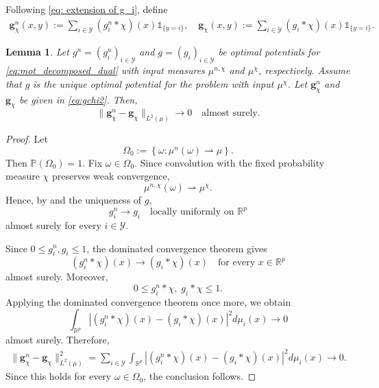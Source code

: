 \documentclass{amsart}
\theoremstyle{plain}
\numberwithin{equation}{section}\newtheorem{theorem}{Theorem}[section]
\newtheorem{lemma}[theorem]{Lemma}
\theoremstyle{remark}
\begin{document}
Following \eqref{eq: extension of g_i}, define
\begin{align}
\label{eq:gchi2}
    \bm g_\chi^n(x,y)
    :=
    \sum_{i\in\mathcal Y}
    (g_i^n*\chi)(x)\mathds 1_{\{y=i\}},
    \quad
    \bm g_\chi(x,y)
    :=
    \sum_{i\in\mathcal Y}
    (g_i*\chi)(x)\mathds 1_{\{y=i\}}.
\end{align}



\begin{lemma}\label{lem: L2 convergence smoothed potentials}
Let $g^n=(g_i^n)_{i\in\mathcal Y}$ and
$g=(g_i)_{i\in\mathcal Y}$ be optimal potentials for
\eqref{eq:mot_decomposed_dual} with input measures
$\mu^{n,\chi}$ and $\mu^\chi$, respectively.
Assume that $g$ is the unique optimal potential for the problem with input $\mu^\chi$. Let $\bm g_\chi^n$ and $\bm g_\chi$ be given in \eqref{eq:gchi2}. Then, 
\[
    \|\bm g_\chi^n-\bm g_\chi\|_{L^2(\mu)}
    \longrightarrow 0 \quad \text{almost surely}.
\]

\end{lemma}

\begin{proof}
Let
\[
    \Omega_0
    :=
    \left\{
        \omega:
        \mu^n(\omega)\rightharpoonup\mu
    \right\}.
\]
Then $\mathbb P(\Omega_0)=1$. Fix $\omega\in\Omega_0$. Since
convolution with the fixed probability measure $\chi$ preserves weak
convergence,
\[
    \mu^{n,\chi}(\omega)\rightharpoonup\mu^\chi.
\]
Hence, by  and the uniqueness of
$g$,
\[
    g_i^n\longrightarrow g_i
    \quad\text{locally uniformly on }\mathbb R^p
\]
almost surely for every $i\in\mathcal Y$.

Since $0\leq g_i^n,g_i\leq1$, the dominated convergence theorem gives
\[
    (g_i^n*\chi)(x)\longrightarrow(g_i*\chi)(x)
    \quad\text{for every }x\in\mathbb R^p
\]
almost surely. Moreover,
\[
    0\leq g_i^n*\chi,\;g_i*\chi\leq1.
\]
Applying the dominated convergence theorem once more, we obtain
\[
    \int_{\mathbb R^p}
    \left|
        (g_i^n*\chi)(x)-(g_i*\chi)(x)
    \right|^2
    d\mu_i(x)
    \longrightarrow0
\]
almost surely. Therefore,
\[
\begin{aligned}
    \|\bm g_\chi^n-\bm g_\chi\|_{L^2(\mu)}^2
    =
    \sum_{i\in\mathcal Y}
    \int_{\mathbb R^p}
    \left|
        (g_i^n*\chi)(x)-(g_i*\chi)(x)
    \right|^2
    d\mu_i(x) \longrightarrow0.
\end{aligned}
\]
Since this holds for every $\omega\in\Omega_0$, the conclusion follows.
\end{proof}
\end{document}
